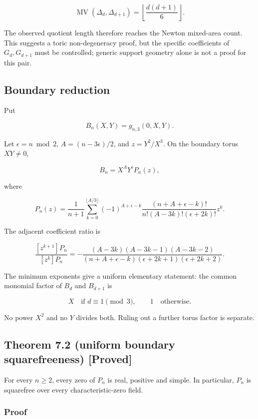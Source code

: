 \documentclass[
]{article}
\begin{document}
\[
\operatorname{MV}(\Delta_d,\Delta_{d+1})
=\left\lfloor\frac{d(d+1)}6\right\rfloor.
\tag{7.2}
\]

The observed quotient length therefore reaches the Newton mixed-area
count. This suggests a toric non-degeneracy proof, but the specific
coefficients of \(G_d,G_{d+1}\) must be controlled; generic support
geometry alone is not a proof for this pair.

\subsection{Boundary reduction}\label{boundary-reduction}

Put

\[
B_n(X,Y)=g_{n,3}(0,X,Y).
\]

Let \(\epsilon=n\bmod2\), \(A=(n-3\epsilon)/2\), and \(z=Y^2/X^3\). On
the boundary torus \(XY\ne0\),

\[
B_n=X^AY^\epsilon P_n(z),
\]

where

\[
P_n(z)=\frac1{n+1}
\sum_{k=0}^{\lfloor A/3\rfloor}
(-1)^{A+\epsilon-k}
\frac{(n+A+\epsilon-k)!}
{n!(A-3k)!(\epsilon+2k)!}z^k.
\tag{7.3}
\]

The adjacent coefficient ratio is

\[
\frac{[z^{k+1}]P_n}{[z^k]P_n}
=-
\frac{(A-3k)(A-3k-1)(A-3k-2)}
{(n+A+\epsilon-k)(\epsilon+2k+1)(\epsilon+2k+2)}.
\tag{7.4}
\]

The minimum exponents give a uniform elementary statement: the common
monomial factor of \(B_d\) and \(B_{d+1}\) is

\[
X\quad\text{if }d\equiv1\pmod3,
\qquad 1\quad\text{otherwise}.
\tag{7.5}
\]

No power \(X^2\) and no \(Y\) divides both. Ruling out a further torus
factor is separate.

\subsection*{Theorem 7.2 (uniform boundary squarefreeness)
{[}Proved{]}}\label{theorem-7.2-uniform-boundary-squarefreeness-proved}

For every \(n\ge2\), every zero of \(P_n\) is real, positive and simple.
In particular, \(P_n\) is squarefree over every characteristic-zero
field.

\subsubsection*{Proof}\label{proof-8}
\end{document}
